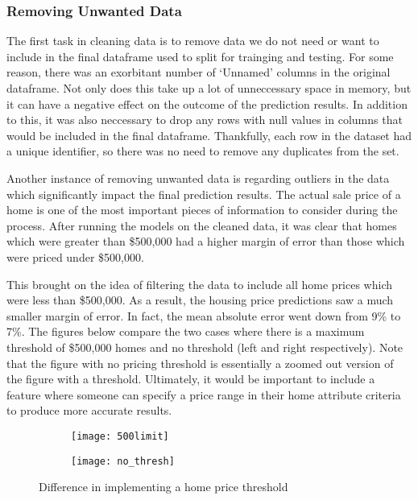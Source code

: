 \documentclass[12pt]{article}
\begin{document}
        \subsubsection{Removing Unwanted Data}
        The first task in cleaning data is to remove data we do not need or want to include in the final dataframe 
        used to split for trainging and testing. For some reason, there was an exorbitant number of `Unnamed' columns
        in the original dataframe. Not only does this take up a lot of unneccessary space in memory, but it can have a negative 
        effect on the outcome of the prediction results. In addition to this, it was also neccessary to drop any rows with 
        null values in columns that would be included in the final dataframe. Thankfully, each row in the dataset had a 
        unique identifier, so there was no need to remove any duplicates from the set.

        Another instance of removing unwanted data is regarding outliers in the data which significantly impact the final 
        prediction results. The actual sale price of a home is one of the most important pieces of information to consider 
        during the process. After running the models on the cleaned data, it was clear that homes which were greater than \$500,000 
        had a higher margin of error than those which were priced under \$500,000. 
        
        This brought on the idea of filtering the data to include all home prices which were less than \$500,000. As a result, the housing price predictions saw a much 
        smaller margin of error. In fact, the mean absolute error went down from 9\% to 7\%. The figures below compare the two 
        cases where there is a maximum threshold of \$500,000 homes and no threshold (left and right respectively). Note that the 
        figure with no pricing threshold is essentially a zoomed out version of the figure with a threshold. Ultimately, it would 
        be important to include a feature where someone can specify a price range in their home attribute criteria to produce 
        more accurate results.
        \begin{figure}[H]
            \begin{subfigure}{0.5\textwidth}
                \centering
                \texttt{[image: 500limit]}
            \end{subfigure}
            \hfill
            \begin{subfigure}{0.5\textwidth}
                \centering
                \texttt{[image: no\_thresh]}
            \end{subfigure}
            \caption{Difference in implementing a home price threshold}
        \end{figure}
\end{document}
